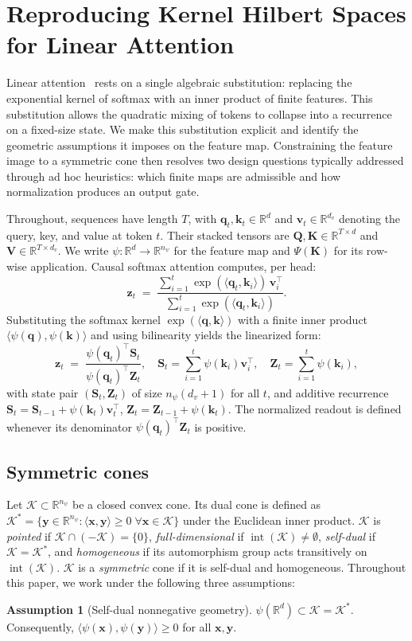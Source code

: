 \documentclass{article}
\newcommand{\1}{\bm{1}}
\newcommand{\lrangle}[1]{\langle#1\rangle}
\def\vk{{\bm{k}}}
\def\vq{{\bm{q}}}
\def\vv{{\bm{v}}}
\def\vx{{\bm{x}}}
\def\vy{{\bm{y}}}
\def\vz{{\bm{z}}}
\def\mK{{\bm{K}}}
\def\mQ{{\bm{Q}}}
\def\mS{{\bm{S}}}
\def\mV{{\bm{V}}}
\def\mZ{{\bm{Z}}}
\def\gK{{\mathcal{K}}}
\newcommand{\R}{\mathbb{R}}
\newcommand{\seql}{T}
\theoremstyle{definition}
\newtheorem{assumption}{Assumption}
\begin{document}
\section{Reproducing Kernel Hilbert Spaces for Linear Attention} \label{sec:rkhs}
Linear attention~\citep{shen21efficient,katharopoulos20transformers} rests on a single algebraic
substitution: replacing the exponential kernel of softmax with an inner product of finite features.
This substitution allows the quadratic mixing of tokens to collapse into a recurrence on a
fixed-size state. We make this substitution explicit and identify the geometric assumptions it imposes on the
feature map. Constraining the feature image to a symmetric cone then resolves two design questions
typically addressed through ad hoc heuristics: which finite maps are admissible and how normalization
produces an output gate.

Throughout, sequences have length $\seql$, with
$\vq_t,\vk_t\in\R^d$ and $\vv_t\in\R^{d_v}$ denoting the query, key, and value at token $t$.
Their stacked tensors are $\mQ,\mK\in\R^{\seql\times d}$ and
$\mV\in\R^{\seql\times d_v}$. We write $\psi:\R^d\!\to\!\R^{n_\psi}$ for the feature map and
$\Psi(\mK)$ for its row-wise application. Causal softmax attention computes, per head:
\begin{equation}
  \vz_t \;=\; \frac{\sum_{i=1}^t \exp(\lrangle{\vq_t,\vk_i})\,\vv_i^\top}{
    \sum_{i=1}^t \exp(\lrangle{\vq_t,\vk_i})}.
  \label{eq:softmax-att}
\end{equation}
Substituting the softmax kernel $\exp(\lrangle{\vq,\vk})$ with a finite inner product
$\lrangle{\psi(\vq),\psi(\vk)}$ and using bilinearity yields the linearized form:
\begin{equation}
  \vz_t \;=\; \frac{\psi(\vq_t)^\top \mS_t}{\psi(\vq_t)^\top \mZ_t}, \quad
  \mS_t = \sum_{i=1}^t \psi(\vk_i)\vv_i^\top, \quad
  \mZ_t = \sum_{i=1}^t \psi(\vk_i),
  \label{eq:linatt}
\end{equation}
with state pair $(\mS_t,\mZ_t)$ of size $n_\psi(d_v+1)$ for all $t$, and additive recurrence
$\mS_t=\mS_{t-1}+\psi(\vk_t)\vv_t^\top$, $\mZ_t=\mZ_{t-1}+\psi(\vk_t)$. The normalized readout is defined whenever its denominator
$\psi(\vq_t)^\top\mZ_t$ is positive.

\subsection{Symmetric cones}
Let $\gK\subset\R^{n_\psi}$ be a closed convex cone. Its dual cone is defined as $\gK^* = \{\vy\in\R^{n_\psi} :
  \lrangle{\vx,\vy}\ge 0\;\forall\vx\in\gK\}$ under the Euclidean inner product. $\gK$ is
\emph{pointed} if $\gK\cap(-\gK)=\{0\}$, \emph{full-dimensional} if
$\operatorname{int}(\gK)\ne\emptyset$, \emph{self-dual} if $\gK=\gK^*$, and \emph{homogeneous} if
its automorphism group acts transitively on $\operatorname{int}(\gK)$. $\gK$ is a \emph{symmetric}
cone if it is self-dual and homogeneous. Throughout this paper, we work under the following three
assumptions:
\begin{assumption}[Self-dual nonnegative geometry]
  \label{ass:pos}
  $\psi(\R^d)\subset\gK=\gK^*$. Consequently,
  $\lrangle{\psi(\vx),\psi(\vy)}\ge 0$ for all $\vx,\vy$.
\end{assumption}
\end{document}
